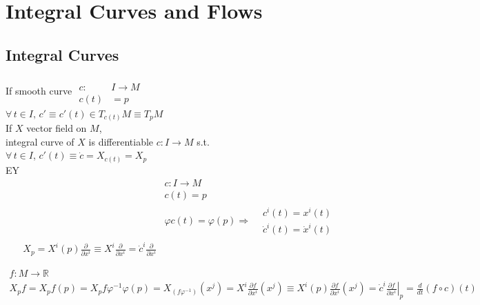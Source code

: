 \section{Integral Curves and Flows }



\subsection*{Integral Curves }

If smooth curve $ \begin{aligned} & \quad \\ 
 c:  & I \to M \\  
 c(t) & = p \end{aligned}$ \\
$\forall \, t \in I ,  \, c' \equiv c'(t) \in T_{c(t)}M \equiv T_p M$ \\

If $X$ vector field on $M$, \\
integral curve of $X$ is differentiable $c: I  \to M$ s.t. \\
\quad $\forall \, t \in I$, $c'(t) \equiv \dot{c} = X_{c(t)} = X_p$  \\

EY  \\
\[
\begin{aligned}
  & c:I \to M \\ 
  & c(t) = p  \\
  & \varphi c(t) = \varphi(p) \Longrightarrow \begin{aligned} & c^i(t) = x^i(t) \\
    & \dot{c}^i(t) = \dot{x}^i(t) \end{aligned} \\
  X_p = X^i(p) \frac{ \partial }{ \partial x^i } \equiv X^i \frac{ \partial }{ \partial x^i } = \dot{c}^i \frac{ \partial }{ \partial x^i } 
\end{aligned}
\]

\[
\begin{gathered}
  f: M \to \mathbb{R} \\ 
  X_p f = X_p f(p) = X_pf \varphi^{-1} \varphi(p) = X_(f\varphi^{-1})(x^j) = X^i \frac{ \partial f}{ \partial x^i }(x^j) \equiv X^i(p)  \frac{ \partial f}{ \partial x^i}(x^j) = \dot{c}^i \left. \frac{ \partial f}{ \partial x^i} \right|_p = \frac{d}{dt}( f \circ c)(t)
\end{gathered}
\]




